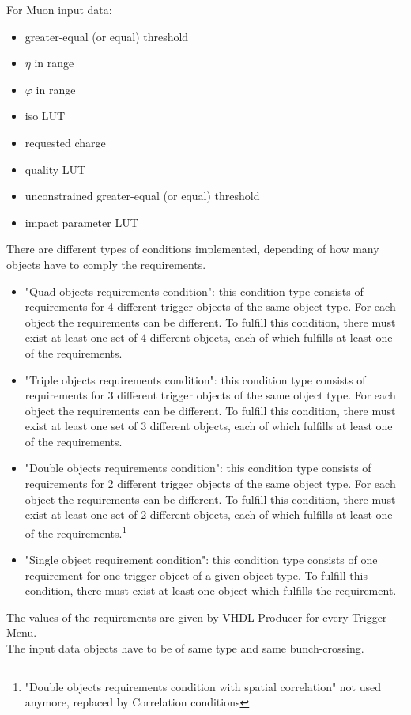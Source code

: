 For Muon input data:
\begin{itemize}
\item \pt greater-equal (or equal) threshold
\item $\eta$ in range
\item $\varphi$ in range
\item iso LUT
\item requested charge
\item quality LUT
\item unconstrained \pt greater-equal (or equal) threshold
\item impact parameter LUT
\end{itemize}

There are different types of conditions implemented, depending of how many objects have to comply the requirements.
\begin{itemize}
\item "Quad objects requirements condition": this condition type consists of requirements for 4 different trigger objects of the same object type.
For each object the requirements can be different. To fulfill this condition, there must exist at least one set of 4 different objects,
each of which fulfills at least one of the requirements.
\item "Triple objects requirements condition": this condition type consists of requirements for 3 different trigger objects of the same object type.
For each object the requirements can be different. To fulfill this condition, there must exist at least one set of 3 different objects,
each of which fulfills at least one of the requirements.
\item "Double objects requirements condition": this condition type consists of requirements for 2 different trigger objects of the same object type.
For each object the requirements can be different. To fulfill this condition, there must exist at least one set of 2 different objects,
each of which fulfills at least one of the requirements.\footnote{"Double objects requirements condition with spatial correlation" not used anymore, replaced by Correlation conditions}
\item "Single object requirement condition": this condition type consists of one requirement for one trigger object of a given object type.
To fulfill this condition, there must exist at least one object which fulfills the requirement.
\end{itemize}

The values of the requirements are given by VHDL Producer for every Trigger Menu.\\
The input data objects have to be of same type and same bunch-crossing.

